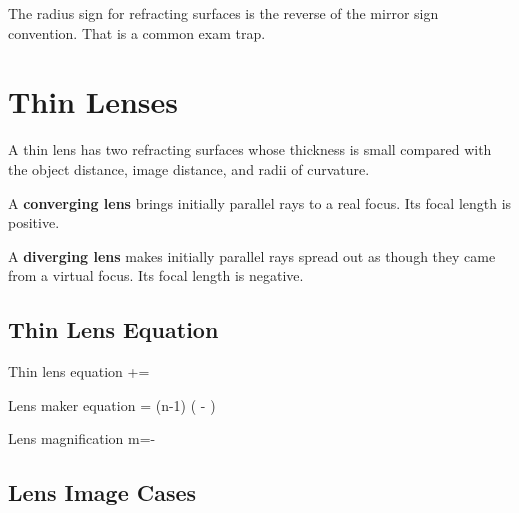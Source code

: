 \documentclass{studentnotes}
\begin{document}
\begin{quicknote}
    The radius sign for refracting surfaces is the reverse of the mirror sign
    convention. That is a common exam trap.
\end{quicknote}

\section{Thin Lenses}

A thin lens has two refracting surfaces whose thickness is small compared with
the object distance, image distance, and radii of curvature.

\begin{definition}
    A \textbf{converging lens} brings initially parallel rays to a real focus.
    Its focal length is positive.
\end{definition}

\begin{definition}
    A \textbf{diverging lens} makes initially parallel rays spread out as though
    they came from a virtual focus. Its focal length is negative.
\end{definition}

\subsection{Thin Lens Equation}

\begin{namedformula}{Thin lens equation}
    +=
\end{namedformula}

\begin{namedformula}{Lens maker equation}
    =
    (n-1)
    \left(
        -
    \right)
\end{namedformula}

\begin{namedformula}{Lens magnification}
    m=-
\end{namedformula}

\subsection{Lens Image Cases}
\end{document}
